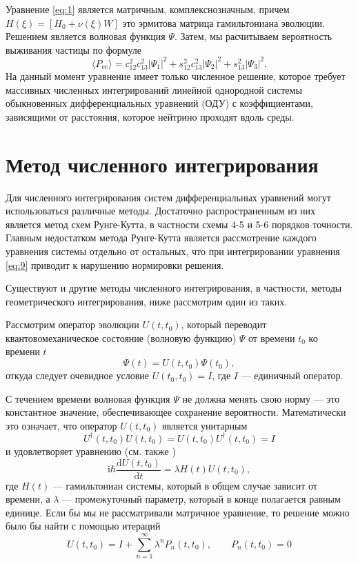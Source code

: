 \documentclass[a4paper,12pt]{article}
\newcommand{\dd}{\mathrm{d}}
\renewcommand{\imath}{\mathrm{i}}
\begin{document}
Уравнение \eqref{eq:1} является матричным, комплекснозначным, причем
\(H(\xi)=[H_{0}+\nu(\xi)W]\) это эрмитова матрица гамильтониана
эволюции. Решением является волновая функция \(\Psi\). Затем, мы расчитываем
вероятность выживания частицы по формуле
\begin{equation}
	\langle P_{ee} \rangle=c_{12}^{2}c_{13}^{2}|\Psi_{1}|^{2}+s_{12}^{2}c_{13}^{2}|\Psi_{2}|^{2}+s_{13}^{2}|\Psi_{3}|^{2}.
\end{equation}
На данный момент уравнение имеет только численное решение, которое требует
массивных численных интегрирований линейной однородной системы обыкновенных
дифференциальных уравнений (ОДУ) с коэффициентами, зависящими от расстояния,
которое нейтрино проходят вдоль среды.

\newpage
\section{Метод численного интегрирования}
Для численного интегрирования систем дифференциальных уравнений могут использоваться различные методы. Достаточно распространенным из них является метод схем Рунге-Кутта, в частности схемы 4-5 и 5-6 порядков точности. Главным недостатком метода Рунге-Кутта является рассмотрение каждого уравнения системы отдельно от остальных, что при интегрировании уравнения \eqref{eq:9} приводит к нарушению нормировки решения.

Существуют и другие методы численного интегрирования, в частности, методы геометрического интегрирования, ниже рассмотрим один из таких.

Рассмотрим оператор эволюции \(U(t,t_{0})\), который переводит
квантовомеханическое состояние (волновую функцию) \(\Psi\) от времени \(t_{0}\)
ко времени \(t\)
\begin{equation*}
	\Psi(t)=U(t,t_{0})\Psi(t_{0}),
\end{equation*}
откуда следует очевидное условие \(U(t_{0},t_{0})=I\), где \(I\) — единичный
оператор.

С течением времени волновая функция \(\Psi\) не должна менять свою норму — это
константное значение, обеспечивающее сохранение вероятности. Математически это
означает, что оператор \(U(t,t_{0})\) является унитарным
\begin{equation*}
	U^{\dag}(t,t_{0})U(t,t_{0})=U(t,t_{0})U^{\dag}(t,t_{0})=I
\end{equation*}
и удовлетворяет уравнению (см. также \cite{Shaydurova:2019})
\begin{equation}\label{eq:2}
	\imath\hbar\frac{\dd U(t,t_{0})}{\dd t}=\lambda H(t)U(t,t_{0}),
\end{equation}
где \(H(t)\) — гамильтониан системы, который в общем случае зависит от времени,
а \(\lambda\) — промежуточный параметр, который в конце полагается равным
единице.  Если бы мы не рассматривали матричное уравнение, то решение можно было
бы найти с помощью итераций
\begin{equation}\label{eq:3}
	U(t,t_{0})=I+\sum_{n=1}^{\infty}\lambda^{n}P_{n}(t,t_{0}),\qquad P_{n}(t,t_{0})=0
\end{equation}
\end{document}
